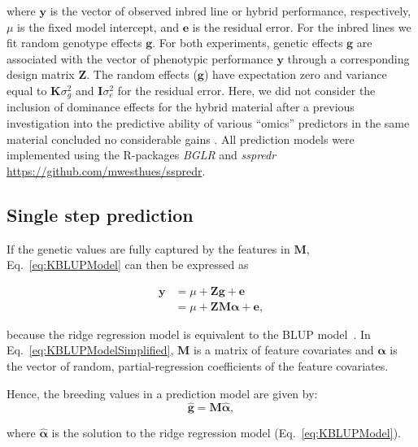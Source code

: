 \documentclass[12pt,titlepage]{article}
\begin{document}
where $\mathbf{y}$ is the vector of observed inbred line or hybrid performance,
respectively, $\mu$ is the fixed model intercept, and $\mathbf{e}$ is the 
residual error.
For the inbred lines we fit random genotype effects $\mathbf{g}$.
For both experiments, genetic effects $\mathbf{g}$ are associated with the
vector of phenotypic performance $\mathbf{y}$ through a corresponding design
matrix $\mathbf{Z}$.
The random effects ($\mathbf{g}$) have expectation zero and variance equal to
$\mathbf{K} \sigma^{2}_{g}$ and $\mathbf{I} \sigma^2_{e}$ for the residual
error.
Here, we did not consider the inclusion of dominance effects for the hybrid
material after a previous investigation into the predictive ability of various
``omics'' predictors in the same material concluded no considerable gains 
\cite{Westhues2017}.
All prediction models were implemented using the R-packages \textit{BGLR}
\cite{Perez2014} and \textit{sspredr}
\url{https://github.com/mwesthues/sspredr}.


\subsection{Single step prediction}
If the genetic values are fully captured by the features in $\mathbf{M}$,
Eq.~\ref{eq:KBLUPModel} can then be expressed as

\begin{align} \label{eq:KBLUPModelSimplified}
	\mathbf{y} &= \mu + \mathbf{Z} \mathbf{g} + \boldsymbol{e} \\
	&= \mu + \mathbf{Z} \mathbf{M} \boldsymbol{\alpha} + \boldsymbol{e},
\end{align}

\cite{Fernando2014} because the ridge regression model is equivalent to the
BLUP model~\cite{Ruppert2003}.
In Eq.~\ref{eq:KBLUPModelSimplified}, $\mathbf{M}$ is a matrix of feature
covariates and $\boldsymbol{\alpha}$ is the vector of random, partial-regression
coefficients of the feature covariates.


Hence, the breeding values in a prediction model are given by:
\begin{equation} \label{eq:mrnaebv}
	\mathbf{\hat{g}} = \mathbf{M}\boldsymbol{\hat{\alpha}},
\end{equation}

where $\boldsymbol{\hat{\alpha}}$ is the solution to the ridge regression model
(Eq.~\ref{eq:KBLUPModel}).
\end{document}
